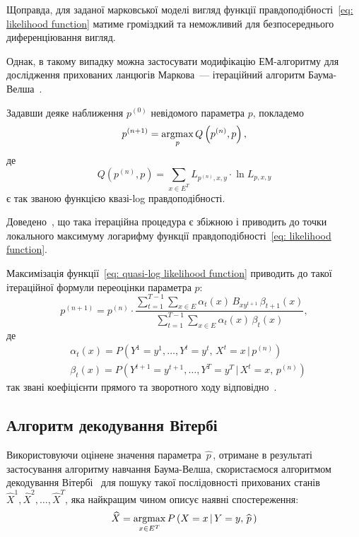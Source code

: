 Щоправда, для заданої марковської моделі вигляд функції правдоподібності~\eqref{eq: likelihood function} матиме громіздкий та неможливий для безпосереднього диференціювання вигляд. 

Однак, в такому випадку можна застосувати модифікацію ЕМ-алгоритму для дослідження прихованих ланцюгів Маркова~--- ітераційний алгоритм Баума-Велша~\cite[розділ 15]{Koski2001}. 

Задавши деяке наближення $p^{(0)}$ невідомого параметра $p$, покладемо
\begin{equation*}\label{eq: p MQL estomation}
    p^{(n+1)} = \operatorname*{argmax}\limits_{p} Q\left( p^{(n)},p \right),
\end{equation*}
де
\begin{equation}\label{eq: quasi-log likelihood function}
    Q\left( p^{(n)},p \right) = \sum_{x \in E^T}L_{p^{(n)},x,y}\cdot\ln L_{p,x,y}
\end{equation}
є так званою функцією квазі-log правдоподібності.

Доведено~\cite[розділ 4]{Koski2001}, що така ітераційна процедура є збіжною і приводить до точки локального максимуму логарифму функції правдоподібності~\eqref{eq: likelihood function}. 

Максимізація функції~\eqref{eq: quasi-log likelihood function} приводить до такої ітераційної формули переоцінки параметра $p:$
\begin{equation}\label{eq: p baum-welch estimation}
    p^{(n+1)} = p^{(n)}\cdot\frac{\sum\limits_{t=1}^{T-1}\sum\limits_{x \in E} \alpha_t(x)\,B_{xy^{t+1}}\,\beta_{t+1}(x)}{\sum\limits_{t=1}^{T-1}\sum\limits_{x \in E} \alpha_t(x)\,\beta_t(x)},
\end{equation}
де 
\begin{align}
    & \alpha_t(x) = P\left( Y^1=y^1,\ldots,Y^t=y^t,\,X^t=x \,|\, p^{(n)} \right) \label{eq: alpha, forward algorithm coefficients} \\
    & \beta_t(x) = P\left( Y^{t+1}=y^{t+1},\ldots,Y^T=y^T \,|\, X^t=x,\, p^{(n)} \right) \label{eq: beta, backward algorithm coefficients}
\end{align}
так звані коефіцієнти прямого та зворотного ходу відповідно~\cite[розділ 5]{Nilsson2005}. 

\subsection*{Алгоритм декодування Вітербі}

Використовуючи оцінене значення параметра $\widehat{\,p\,}$, отримане в результаті застосування алгоритму навчання Баума-Велша, скористаємося алгоритмом декодування Вітербі~\cite[розділ 6]{Nilsson2005} для пошуку такої послідовності прихованих станів $\widehat{X}^1,\widehat{X}^2,\ldots,\widehat{X}^T$, яка найкращим чином описує наявні спостереження:
\begin{equation*}\label{eq: decoded stated}
    \widehat{X} = \operatorname*{argmax}\limits_{x \in E^T} P\left( X=x\,|\,Y=y,\widehat{\,p\,} \right)
\end{equation*}

